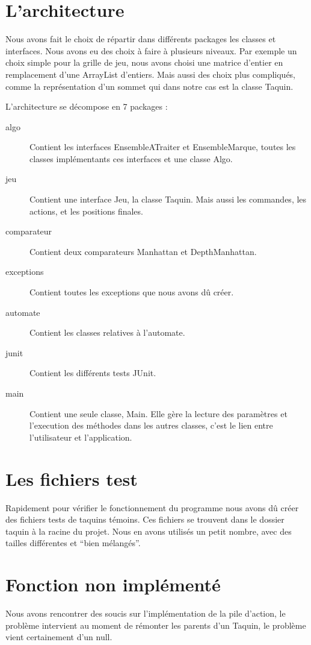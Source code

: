 ﻿\documentclass[a4paper,twoside,12pt]{report}
\begin{document}
\section{L'architecture}
\par
Nous avons fait le choix de répartir dans différents packages les classes et 
interfaces. Nous avons eu des choix à faire à plusieurs niveaux. Par
exemple un choix simple pour la grille de jeu, nous avons choisi une matrice 
d'entier en remplacement d'une ArrayList d'entiers. Mais aussi des choix plus
compliqués, comme la représentation d'un sommet qui dans notre cas est la classe 
Taquin.
\par\noindent
L'architecture se décompose en 7 packages : 
\begin{description}
 \item [algo] Contient les interfaces EnsembleATraiter et EnsembleMarque, toutes 
les classes implémentants ces interfaces et une classe Algo.
 \item [jeu] Contient une interface Jeu, la classe Taquin. Mais aussi les 
commandes, les actions, et les positions finales.
 \item [comparateur] Contient deux comparateurs Manhattan et DepthManhattan.
 \item [exceptions] Contient toutes les exceptions que nous avons dû créer.
 \item [automate] Contient les classes relatives à l'automate.
 \item [junit] Contient les différents tests JUnit.
 \item [main] Contient une seule classe, Main. Elle gère la lecture des 
paramètres et l'execution des méthodes dans les autres classes, c'est
 le lien entre l'utilisateur et l'application.
\end{description}

\section{Les fichiers test}
\par
Rapidement pour vérifier le fonctionnement du programme nous avons dû créer des fichiers tests de taquins témoins. Ces fichiers se trouvent dans le dossier taquin
à la racine du projet. Nous en avons utilisés un petit nombre, avec des tailles différentes et ``bien mélangés''.
%
\section{Fonction non implémenté}
Nous avons rencontrer des soucis sur l'implémentation de la pile d'action, le problème intervient au moment de rémonter les parents d'un Taquin, le problème vient
certainement d'un null.
\end{document}
